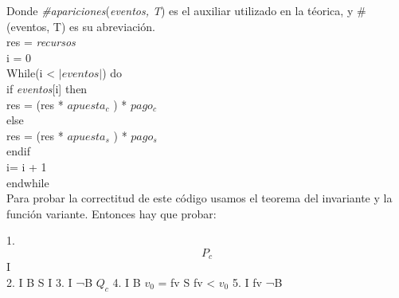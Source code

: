 \documentclass[10pt,a4paper]{article}
\begin{document}
    Donde \textit{\#apariciones}(\textit{eventos, T}) es el auxiliar utilizado en la téorica, y \# (eventos, T) es su abreviación. \\
    
    res = \textit{recursos}\\
    i = 0 \\
    While(i < $|{\textit{eventos}}\vert$) do \\
    if \textit{eventos}[i] then \\
    res = (res * $apuesta_{c}$ ) * $pago_{c}$ \\
    else \\
    res = (res * $apuesta_{s}$ ) * $pago_{s}$ \\
    endif \\
    i= i + 1 \\
    endwhile \\
     
    Para probar la correctitud de este código usamos el teorema del invariante y la función variante. Entonces hay que probar:

        1. $$P_{c}$$ \implica I \\
        2. I \y B S I
        3. I \y ¬B \implica $Q_{c}$
        4. {I \y B \y $v_{0}$ = fv} S {fv < $v_{0}$}
        5. I \y fv  \implica ¬B

    \\
    \begin{enumerate}
    \end{enumerate}  
\end{document}
